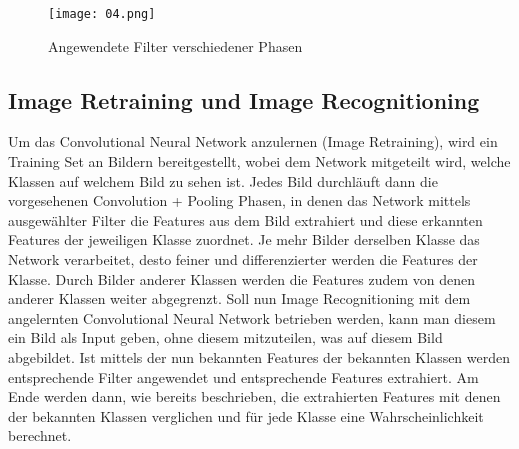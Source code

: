 \begin{figure}[!h]
	\texttt{[image: 04.png]}
	\caption{Angewendete Filter verschiedener Phasen}
	\label{fig:04}
\end{figure}

\subsection{Image Retraining und Image Recognitioning}
Um das Convolutional Neural Network anzulernen (Image Retraining), wird ein Training Set an Bildern bereitgestellt, wobei dem Network mitgeteilt wird, welche Klassen auf welchem Bild zu sehen ist. Jedes Bild durchläuft dann die vorgesehenen Convolution + Pooling Phasen, in denen das Network mittels ausgewählter Filter die Features aus dem Bild extrahiert und diese erkannten Features der jeweiligen Klasse zuordnet. Je mehr Bilder derselben Klasse das Network verarbeitet, desto feiner und differenzierter werden die Features der Klasse. Durch Bilder anderer Klassen werden die Features zudem von denen anderer Klassen weiter abgegrenzt. Soll nun Image Recognitioning mit dem angelernten Convolutional Neural Network betrieben werden, kann man diesem ein Bild als Input geben, ohne diesem mitzuteilen, was auf diesem Bild abgebildet. Ist mittels der nun bekannten Features der bekannten Klassen werden entsprechende Filter angewendet und entsprechende Features extrahiert. Am Ende werden dann, wie bereits beschrieben, die extrahierten Features mit denen der bekannten Klassen verglichen und für jede Klasse eine Wahrscheinlichkeit berechnet.